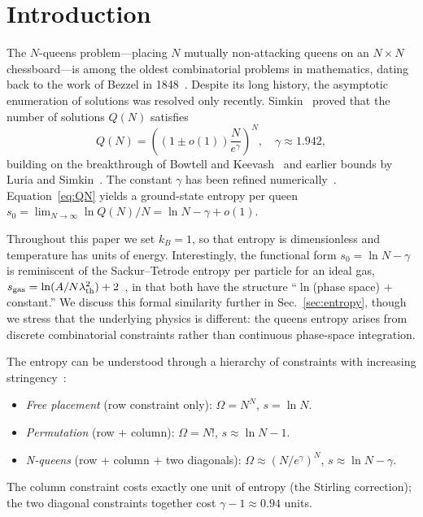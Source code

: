 \documentclass[aps, pre, reprint, amsmath, amssymb, superscriptaddress, floatfix]{revtex4-2}
\begin{document}
\section{Introduction}
\label{sec:intro}

The $N$-queens problem---placing $N$ mutually non-attacking queens on
an $N \times N$ chessboard---is among the oldest combinatorial
problems in mathematics, dating back to the work of Bezzel in
1848~\cite{Bezzel1848}.  Despite its long history, the asymptotic
enumeration of solutions was resolved only recently.  Simkin~\cite{Simkin2022}
proved that the number of solutions $Q(N)$ satisfies
\begin{equation}
  Q(N) = \left((1 \pm o(1))\frac{N}{e^{\gamma}} \right)^N, \quad
  \gamma \approx 1.942,
  \label{eq:QN}
\end{equation}
building on the breakthrough of Bowtell and
Keevash~\cite{Bowtell2023} and earlier bounds by Luria and
Simkin~\cite{Luria2021}.  The constant $\gamma$ has been refined
numerically~\cite{Nobel2023}.  Equation~\eqref{eq:QN} yields a
ground-state entropy per queen
$s_0 = \lim_{N \to \infty} \ln Q(N)/N = \ln N - \gamma + o(1)$.

Throughout this paper we set $k_B = 1$, so that entropy is
dimensionless and temperature has units of energy.
Interestingly, the functional form $s_0 = \ln N - \gamma$ is
reminiscent of the Sackur--Tetrode entropy per particle for an
ideal gas, $s_{\rm gas} = \ln(A/N\lambda_{\rm th}^2) + 2$~\cite{Reif1965},
in that both have the structure ``$\ln$(phase space) $+$ constant.''
We discuss this formal similarity further in
Sec.~\ref{sec:entropy}, though we stress that the underlying
physics is different: the queens entropy arises from discrete
combinatorial constraints rather than continuous phase-space
integration.

The entropy can be understood through a hierarchy of constraints
with increasing stringency~\cite{Knuth2022}:
\begin{itemize}
  \item \textit{Free placement} (row constraint only):
    $\Omega = N^N$, $s = \ln N$.
  \item \textit{Permutation} (row + column):
    $\Omega = N!$, $s \approx \ln N - 1$.
  \item \textit{N-queens} (row + column + two diagonals):
    $\Omega \approx (N/e^\gamma)^N$, $s \approx \ln N - \gamma$.
\end{itemize}
The column constraint costs exactly one unit of entropy (the
Stirling correction); the two diagonal constraints together cost
$\gamma - 1 \approx 0.94$ units.
\end{document}
